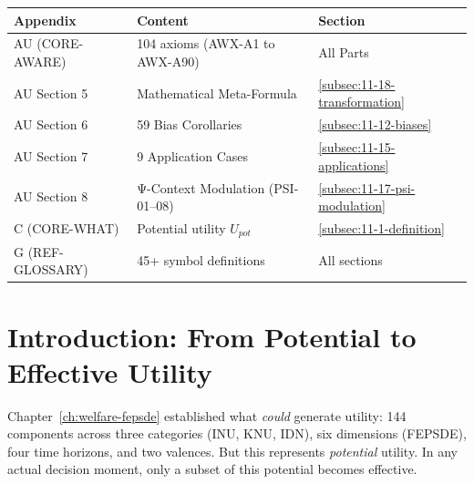\begin{tcolorbox}[
    colback=yellow!10!white,
    colframe=orange!75!black,
    title={\textbf{Appendix References for This Chapter}},
    fonttitle=\bfseries
]
\begin{tabular}{lll}
\textbf{Appendix} & \textbf{Content} & \textbf{Section} \\
\midrule
AU (CORE-AWARE) & 104 axioms (AWX-A1 to AWX-A90) & All Parts \\
AU Section 5 & Mathematical Meta-Formula & \ref{subsec:11-18-transformation} \\
AU Section 6 & 59 Bias Corollaries & \ref{subsec:11-12-biases} \\
AU Section 7 & 9 Application Cases & \ref{subsec:11-15-applications} \\
AU Section 8 & Ψ-Context Modulation (PSI-01--08) & \ref{subsec:11-17-psi-modulation} \\
C (CORE-WHAT) & Potential utility $U_{pot}$ & \ref{subsec:11-1-definition} \\
G (REF-GLOSSARY) & 45+ symbol definitions & All sections
\end{tabular}
\end{tcolorbox}



\section{Introduction: From Potential to Effective Utility}
\label{sec:awareness-intro}


Chapter~\ref{ch:welfare-fepsde} established what \emph{could} generate utility:
144 components across three categories (INU, KNU, IDN), six dimensions (FEPSDE),
four time horizons, and two valences. But this represents \emph{potential} utility.
In any actual decision moment, only a subset of this potential becomes effective.


